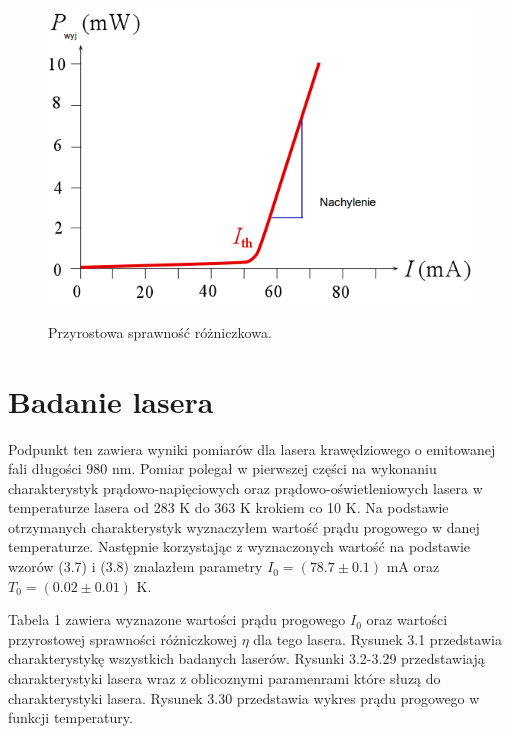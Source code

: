\documentclass[a4paper, portrait,12pt]{report}
\begin{document}
\begin{figure}[h]
\center
  \includegraphics[scale=0.40]{slope.png}
  \label{rys1}
  \caption{Przyrostowa sprawność różniczkowa.} 
\end{figure}

\newpage








\section{Badanie lasera}
Podpunkt ten zawiera wyniki pomiarów dla lasera krawędziowego o emitowanej fali długości 980 nm.
Pomiar polegał w pierwszej części na wykonaniu charakterystyk prądowo-napięciowych
oraz prądowo-oświetleniowych lasera w temperaturze lasera od 283 K do 363 K krokiem co 10 K.
Na podstawie otrzymanych charakterystyk wyznaczyłem wartość prądu progowego w danej temperaturze.
Następnie korzystając z wyznaczonych wartość na podstawie wzorów (3.7) i (3.8) znalazłem
parametry $I_{0} = (78.7 \pm 0.1)$ mA oraz $T_0 = (0.02 \pm 0.01)$ K.

Tabela 1 zawiera wyznazone wartości prądu progowego $I_0$ oraz wartości przyrostowej sprawności różniczkowej $\eta$ dla tego lasera. Rysunek 3.1 przedstawia charakterystykę wszystkich badanych laserów. Rysunki 3.2-3.29 przedstawiają charakterystyki lasera wraz z oblicoznymi paramenrami które słuzą do charakterystyki lasera. Rysunek 3.30 przedstawia wykres prądu progowego w funkcji temperatury. \\ 
\end{document}

